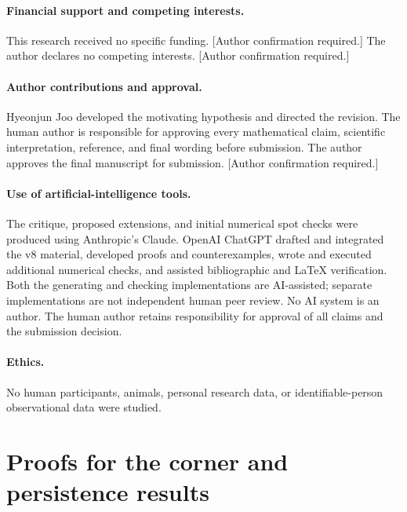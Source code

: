 \documentclass[11pt,a4paper]{article}
\theoremstyle{definition}\newtheorem{definition}{Definition}
\begin{document}
\paragraph{Financial support and competing interests.}
This research received no specific funding.
\textup{[Author confirmation required.]} %
The author declares no competing interests.
\textup{[Author confirmation required.]} %
\paragraph{Author contributions and approval.}
Hyeonjun Joo developed the motivating hypothesis and directed the revision.
The human author is responsible for approving every mathematical claim,
scientific interpretation, reference, and final wording before submission.
The author approves the final manuscript for submission.
\textup{[Author confirmation required.]} %
\paragraph{Use of artificial-intelligence tools.}
The critique, proposed extensions, and initial numerical spot checks were
produced using Anthropic's Claude. OpenAI ChatGPT drafted and integrated the v8 material, developed
proofs and counterexamples, wrote and executed additional numerical checks,
and assisted bibliographic and LaTeX verification. Both the generating and checking implementations
are AI-assisted; separate implementations are not independent human peer
review. No AI system is an author. The human author retains responsibility
for approval of all claims and the submission decision.
\paragraph{Ethics.}
No human participants, animals, personal research data, or identifiable-person
observational data were studied.

\appendix
\section{Proofs for the corner and persistence results}
\label{app:stage1-proofs}
\end{document}
